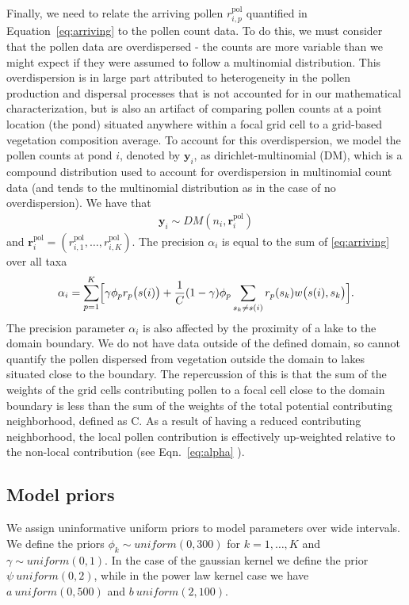\documentclass[12pt]{article}
\begin{document}
Finally, we need to relate the arriving pollen $r_{i,p}^{\text{pol}}$
quantified in Equation~\ref{eq:arriving} to the pollen count data. To
do this, we must consider that the pollen data are overdispersed - the
counts are more variable than we might expect if they were assumed to
follow a multinomial distribution. This overdispersion is in large
part attributed to heterogeneity in the pollen production and
dispersal processes that is not accounted for in our mathematical
characterization, but is also an artifact of comparing pollen counts
at a point location (the pond) situated anywhere within a focal grid
cell to a grid-based vegetation composition average. To account for
this overdispersion, we model the pollen counts at pond $i$, denoted
by $\bm{y}_i$, as dirichlet-multinomial (DM), which is a compound
distribution used to account for overdispersion in multinomial count
data (and tends to the multinomial distribution as in the case of no
overdispersion). We have that
\begin{align}
\bm{y}_i \sim DM (n_i, \bm{r}_i^{\text{pol}})
\label{eq:DM}
\end{align}
and $\bm{r}_i^{\text{pol}} = (r_{i,1}^{\text{pol}}, \ldots, r_{i,K}^{\text{pol}})$.
The precision $\alpha_i$ is equal to the sum of \ref{eq:arriving} over all taxa
\begin{align}
\alpha_i = \sum_{p=1}^K \Bigl[\gamma \phi_p r_p\bigl(s(i)\bigr) + \frac{1}{C} (1-\gamma) \phi_p \sum_{s_k \neq s(i) } r_p(s_k) w\bigl(s(i), s_k\bigr)\Bigr].
\label{eq:alpha}
\end{align}
The precision parameter $\alpha_i$ is also affected by the proximity
of a lake to the domain boundary. We do not have data outside of the
defined domain, so cannot quantify the pollen dispersed from
vegetation outside the domain to lakes situated close to the
boundary. The repercussion of this is that the sum of the weights of
the grid cells contributing pollen to a focal cell close to the domain
boundary is less than the sum of the weights of the total potential
contributing neighborhood, defined as C. As a result of having a
reduced contributing neighborhood, the local pollen contribution is
effectively up-weighted relative to the non-local contribution (see
Eqn.~\ref{eq:alpha} ).

\subsection{Model priors}

We assign uninformative uniform priors to model parameters over wide
intervals. We define the priors $\phi_k \sim uniform(0, 300)$ for
$k=1, \ldots, K$ and $\gamma \sim uniform(0,1)$. In the case of the
gaussian kernel we define the prior $\psi ~ uniform(0, 2)$, while in
the power law kernel case we have $a ~ uniform(0, 500)$ and
$b~uniform(2, 100)$.
\end{document}
